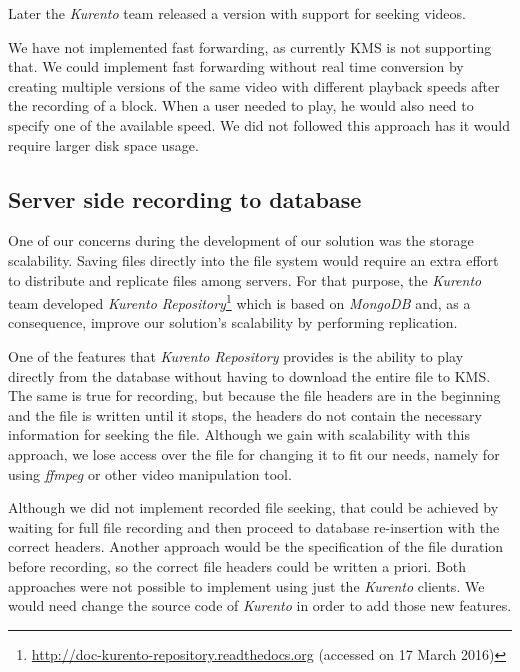 	Later the \emph{Kurento} team released a version with support for seeking videos.%

	We have not implemented fast forwarding, as currently \ac{KMS} is not supporting that. We could implement fast forwarding without real time conversion by creating multiple versions of the same video with different playback speeds after the recording of a block. When a user needed to play, he would also need to specify one of the available speed. We did not followed this approach has it would require larger disk space usage. 

\subsection{Server side recording to database}

	One of our concerns during the development of our solution was the storage scalability. Saving files directly into the file system would require an extra effort to distribute and replicate files among servers. For that purpose, the \emph{Kurento} team developed \emph{Kurento Repository}\footnote{\url{http://doc-kurento-repository.readthedocs.org} (accessed on 17 March 2016)} which is based on \emph{MongoDB} and, as a consequence, improve our solution's scalability by performing replication.

	One of the features that \emph{Kurento Repository} provides is the ability to play directly from the database without having to download the entire file to \ac{KMS}. The same is true for recording, but because the file headers are in the beginning and the file is written until it stops, the headers do not contain the necessary information for seeking the file.
	Although we gain with scalability with this approach, we lose access over the file for changing it to fit our needs, namely for using \emph{ffmpeg} or other video manipulation tool.
        
	Although we did not implement recorded file seeking, that could be achieved by waiting for full file recording and then proceed to database re-insertion with the correct headers. Another approach would be the specification of the file duration before recording, so the correct file headers could be written a priori. Both approaches were not possible to implement using just the \emph{Kurento} clients. We would need change the source code of \emph{Kurento} in order to add those new features.
        
    



